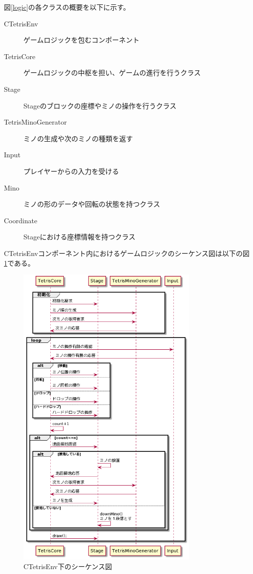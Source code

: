 \documentclass[a4paper,11pt]{jsarticle}
\begin{document}
図\ref{logic}の各クラスの概要を以下に示す。
\begin{description}
\item[CTetrisEnv] ゲームロジックを包むコンポーネント
\item[TetrisCore] ゲームロジックの中枢を担い、ゲームの進行を行うクラス
\item[Stage] Stageのブロックの座標やミノの操作を行うクラス
\item[TetrisMinoGenerator] ミノの生成や次のミノの種類を返す
\item[Input] プレイヤーからの入力を受ける
\item[Mino] ミノの形のデータや回転の状態を持つクラス
\item[Coordinate] Stageにおける座標情報を持つクラス  
\end{description}

CTetrisEnvコンポーネント内におけるゲームロジックのシーケンス図は以下の図\ref{sequence}である。

\begin{figure}[htbp]
\begin{center}
\includegraphics[width=0.8\textwidth]{sequence.png}
\caption{CTetrisEnv下のシーケンス図}
\label{sequence}
\end{center}
\end{figure}
\clearpage
\end{document}
